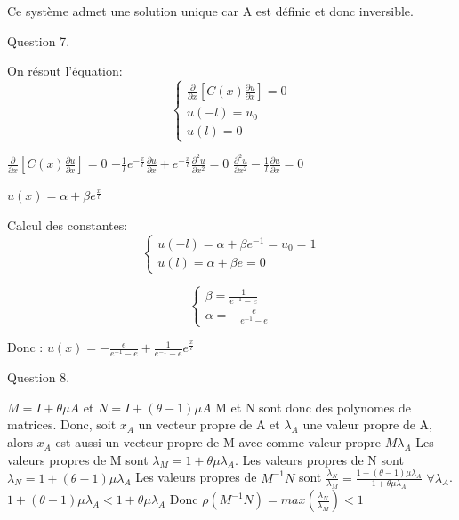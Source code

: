 \documentclass[a4paper,11pt]{article}
\theoremstyle{nonumberplain}
\theoremstyle{nonumberplain}
\theoremstyle{nonumberplain}
\begin{document}
    Ce système admet une solution unique car A est définie et donc inversible.
    \newline

    Question 7.

    On résout l'équation:
    $$\left\{
    \begin{array}{ll}
      \frac{\partial}{\partial x}[C(x)\frac{\partial u}{\partial x}] = 0 \\
      u(-l) = u_0 \\
      u(l) = 0
      \end{array}
    \right.
    $$

    $  \frac{\partial}{\partial x}[C(x)\frac{\partial u}{\partial x}] = 0 $
    $  -\frac{1}{l} e^{-\frac{x}{l}}\frac{\partial u}{\partial x} + e^{-\frac{x}{l}} \frac{\partial^2 u }{\partial x^2} = 0 $
    $ \frac{\partial^2 u}{\partial x^2} - \frac{1}{l} \frac{\partial u}{\partial x} = 0$

    $u(x) = \alpha + \beta e^{\frac{x}{l}} $

    Calcul des constantes:
    $$\left\{
      \begin{array}{ll}
        u(-l) = \alpha + \beta e^{-1} = u_0 = 1 \\
        u(l) = \alpha + \beta e = 0
      \end{array}
    \right.
    $$

    $$\left\{
      \begin{array}{ll}
        \beta = \frac{1}{e^{-1} - e} \\
        \alpha = -\frac{e}{e^{-1} - e}
      \end{array}
    \right.
    $$

    Donc :
    $u(x) = -\frac{e}{e^{-1} - e} + \frac{1}{e^{-1} - e} e^{\frac{x}{l}} $

    Question 8.
    \newline

    $M = I+ \theta \mu A$ et $N = I+(\theta - 1)\mu A$
    \newline
    M et N sont donc des polynomes de matrices.
    \newline
    Donc, soit $x_A$ un vecteur propre de A et $\lambda_A$ une valeur propre de A,
    alors $x_A$ est aussi un vecteur propre de M avec comme valeur propre $M\lambda_A$
    \newline
    Les valeurs propres de M sont $\lambda_M = 1+\theta \mu \lambda_A$.
    \newline
    Les valeurs propres de N sont $\lambda_N = 1+(\theta - 1)\mu \lambda_A$
    \newline
    Les valeurs propres de $M^{-1}N$ sont $\frac{\lambda_N}{\lambda_M} = \frac{1+(\theta - 1)\mu \lambda_A}{1+\theta \mu \lambda_A}$ $\forall \lambda_A$.
    $ 1+(\theta - 1)\mu \lambda_A < 1+\theta \mu \lambda_A$
    \newline
    Donc $\rho(M^{-1}N) = max(\frac{\lambda_N}{\lambda_M}) < 1$
    \newline
    \newline
    \vspace{12ex}
\end{document}
